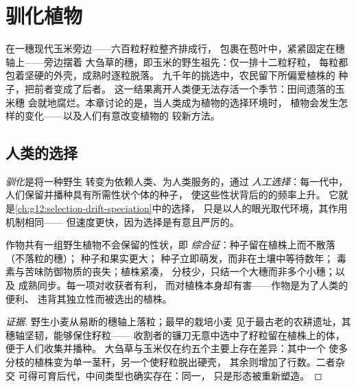 \chapter{驯化植物}\label{ch:g12:domesticated-plants}

在一穗现代玉米旁边——六百粒籽粒整齐排成行，
包裹在苞叶中，紧紧固定在穗轴上——旁边摆着
大刍草的穗，即玉米的野生祖先：仅一排十二粒籽粒，
每粒都包着坚硬的外壳，成熟时逐粒脱落。
九千年的挑选中，农民留下所偏爱植株的
种子，把前者变成了后者。
这一结果离开人类便无法存活一个季节：田间遗落的玉米穗
会就地腐烂。本章讨论的是，当人类成为植物的选择环境时，
植物会发生怎样的变化——以及人们有意改变植物的
较新方法。

\section{人类的选择}

\begin{definition}[驯化、人工选择]\label{def:g12:domesticated-plants:domestication}
\emph{驯化}是将一种野生
转变为依赖人类、为人类服务的，通过
\emph{人工选择}：每一代中，
人们保留并播种具有所需性状个体的种子，
使这些性状背后的的频率上升。
它就是\cref{ch:g12:selection-drift-speciation}中的选择，
只是以人的眼光取代环境，其作用机制相同——
但速度更快，因为选择是有意且严厉的。
\end{definition}

\begin{proposition}[驯化选择的性状]\label{prop:g12:domesticated-plants:traits}
作物共有一组野生植物不会保留的性状，即
\emph{综合征}：种子留在植株上而不散落（不落粒的穗）；
种子和果实更大；
种子立即萌发，而非在土壤中等待数年；
毒素与苦味防御物质的丧失；植株紧凑，
分枝少，只结一个大穗而非多个小穗；以及
成熟同步。每一项对收获者有利，
而对植株本身却有害——作物是为了人类的便利、
违背其独立性而被选出的植株。
\end{proposition}
\begin{proof}[证据]
野生小麦从易断的穗轴上落粒；最早的栽培小麦
见于最古老的农耕遗址，其穗轴坚韧，能够保住籽粒——
收割者的镰刀无意中选中了籽粒留在植株上的体，
便于人们收集并播种。
大刍草与玉米仅在约五个主要上存在差异：其中一个
使多分枝的植株变为单一茎秆，另一个使籽粒脱出硬壳，
其余则增加了行数。二者杂交
可得可育后代，中间类型也确实存在：同一，
只是形态被重新塑造。
\end{proof}

